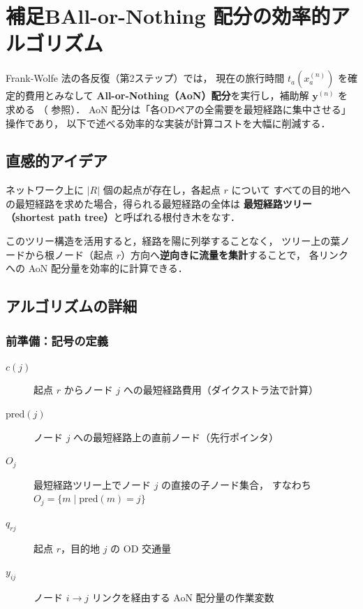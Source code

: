 \section{補足B\quad All-or-Nothing 配分の効率的アルゴリズム}
\label{sec:appendix-B}

Frank-Wolfe 法の各反復（第2ステップ）では，
現在の旅行時間 $t_a(x_a^{(n)})$ を確定的費用とみなして
\textbf{All-or-Nothing（AoN）配分}を実行し，補助解 $\boldsymbol{y}^{(n)}$ を求める
（  参照）．
AoN 配分は「各ODペアの全需要を最短経路に集中させる」操作であり，
以下で述べる効率的な実装が計算コストを大幅に削減する．

\subsection{直感的アイデア}
\label{subsec:appendix-B-idea}

ネットワーク上に $|R|$ 個の起点が存在し，各起点 $r$ について
すべての目的地への最短経路を求めた場合，得られる最短経路の全体は
\textbf{最短経路ツリー（shortest path tree）}と呼ばれる根付き木をなす．

このツリー構造を活用すると，経路を陽に列挙することなく，
ツリー上の葉ノードから根ノード（起点 $r$）方向へ\textbf{逆向きに流量を集計}することで，
各リンクへの AoN 配分量を効率的に計算できる．

\subsection{アルゴリズムの詳細}
\label{subsec:appendix-B-algorithm}

\subsubsection*{前準備：記号の定義}

\begin{description}
  \item[$c(j)$] 起点 $r$ からノード $j$ への最短経路費用（ダイクストラ法で計算）
  \item[$\mathrm{pred}(j)$] ノード $j$ への最短経路上の直前ノード（先行ポインタ）
  \item[$O_j$] 最短経路ツリー上でノード $j$ の直接の子ノード集合，
               すなわち $O_j = \{m \mid \mathrm{pred}(m) = j\}$
  \item[$q_{rj}$] 起点 $r$，目的地 $j$ の OD 交通量
  \item[$y_{ij}$] ノード $i \to j$ リンクを経由する AoN 配分量の作業変数
\end{description}

